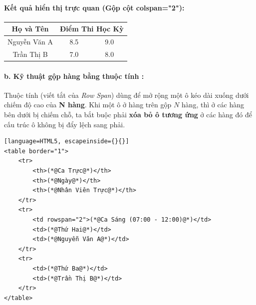 \paragraph{\textbf{Kết quả hiển thị trực quan (Gộp cột colspan="2"):}}
\begin{prettyTableBox}[Kết Quả Hiển Thị Gộp Cột Colspan (border="1")]
\centering
\vspace{4pt}
\bgroup
\renewcommand{\arraystretch}{1.4}
\setlength{\tabcolsep}{14pt}
\begin{tabular}{|c|c|c|}
\hline
\textbf{Họ và Tên} & \multicolumn{2}{c|}{\textbf{Điểm Thi Học Kỳ}} \\
\hline
Nguyễn Văn A & 8.5 & 9.0 \\
\hline
Trần Thị B & 7.0 & 8.0 \\
\hline
\end{tabular}
\egroup
\vspace{4pt}
\end{prettyTableBox}

\paragraph{b. Kỹ thuật gộp hàng bằng thuộc tính :}

Thuộc tính  (viết tắt của \textit{Row Span}) dùng để mở rộng một ô kéo dài xuống dưới chiếm độ cao của \textbf{N hàng}. Khi một ô ở hàng trên gộp $N$ hàng, thì ở các hàng bên dưới bị chiếm chỗ, ta bắt buộc phải \textbf{xóa bỏ ô tương ứng} ở các hàng đó để cấu trúc ô không bị đẩy lệch sang phải.

\begin{codeWindow}
\begin{lstlisting}[language=HTML5, escapeinside={}{}]
<table border="1">
    <tr>
        <th>(*@Ca Trực@*)</th>
        <th>(*@Ngày@*)</th>
        <th>(*@Nhân Viên Trực@*)</th>
    </tr>
    <tr>
        <td rowspan="2">(*@Ca Sáng (07:00 - 12:00)@*)</td>
        <td>(*@Thứ Hai@*)</td>
        <td>(*@Nguyễn Văn A@*)</td>
    </tr>
    <tr>
        <td>(*@Thứ Ba@*)</td>
        <td>(*@Trần Thị B@*)</td>
    </tr>
</table>
\end{lstlisting}
\end{codeWindow}

